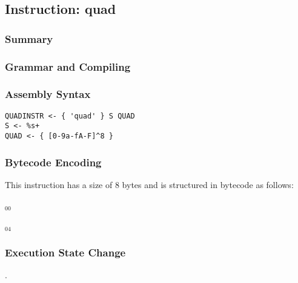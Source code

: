 \subsection{Instruction: quad}

\subsubsection{Summary}


\subsubsection{Grammar and Compiling}


\subsubsection{Assembly Syntax}

\begin{myquote}
\begin{verbatim}
QUADINSTR <- { 'quad' } S QUAD
S <- %s+
QUAD <- { [0-9a-fA-F]^8 }
\end{verbatim}
\end{myquote}


\subsubsection{Bytecode Encoding}

This instruction has a size of 8 bytes and is structured in bytecode as follows:

$_{00}$\ 



$_{04}$\ 


\subsubsection{Execution State Change}

.


